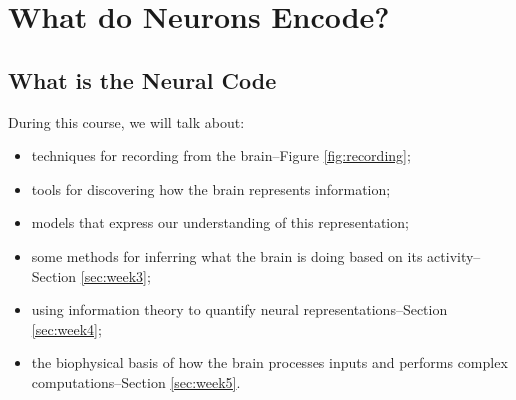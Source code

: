 \documentclass[]{article}
\begin{document}
\section{What do Neurons Encode?}\label{sec:week2}

\subsection{What is the Neural Code}
During this course, we will talk about:

\begin{itemize}
	\item techniques for recording from the brain--Figure \ref{fig:recording};
	\item  tools for discovering how the brain represents information;
	\item models that express our understanding of this representation;
	\item  some methods for inferring what the brain is doing based on its activity--Section \ref{sec:week3};
	\item  using information theory to quantify neural representations--Section \ref{sec:week4};
	\item the biophysical basis of how the brain processes inputs and performs complex computations--Section \ref{sec:week5}.
\end{itemize}
\end{document}
